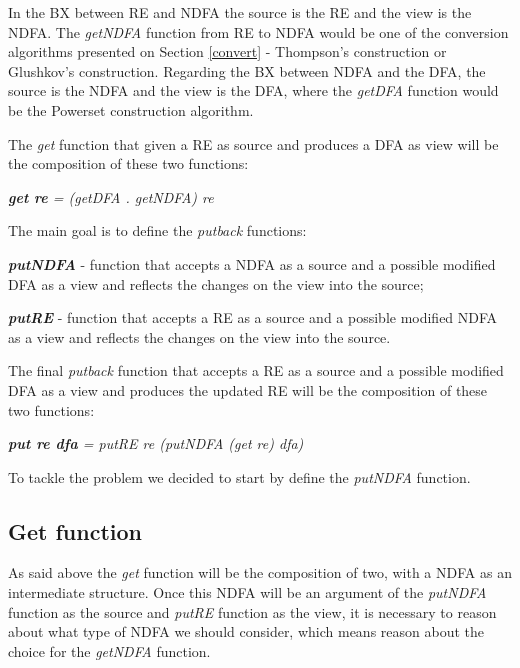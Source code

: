 In the BX between RE and NDFA the source is the RE and the view is the NDFA. The \textit{getNDFA} function from RE to NDFA would be one of the conversion algorithms presented on Section \ref{convert} - Thompson's construction or Glushkov's construction. Regarding the BX between NDFA and the DFA, the source is the NDFA and the view is the DFA, where the \textit{getDFA} function would be the Powerset construction algorithm.

\vspace{5mm}
The \textit{get} function that given a RE as source and produces a DFA as view will be the composition of these two functions:

\begin{center}
    \textit{\textbf{get re} = (getDFA . getNDFA) re}
\end{center}

\vspace{5mm}
The main goal is to define the \textit{putback} functions:

\vspace{3mm}
\textbf{\textit{putNDFA}} - function that accepts a NDFA as a source and a possible modified DFA as a view and reflects the changes on the view into the source;
    
\textbf{\textit{putRE}} - function that accepts a RE as a source and a possible modified NDFA as a view and reflects the changes on the view into the source.

\vspace{5mm}
The final \textit{putback} function that accepts a RE as a source and a possible modified DFA as a view and produces the updated RE will be the composition of these two functions:


\begin{center}
    \textit{\textbf{put re dfa} = putRE re (putNDFA (get re) dfa)}
\end{center}

To tackle the problem we decided to start by define the \textit{putNDFA} function.

\subsection{Get function}
As said above the \textit{get} function will be the composition of two, with a NDFA as an intermediate structure. Once this NDFA will be an argument of the \textit{putNDFA} function as the source and \textit{putRE} function as the view, it is necessary to reason about what type of NDFA we should consider, which means reason about the choice for the \textit{getNDFA} function.

